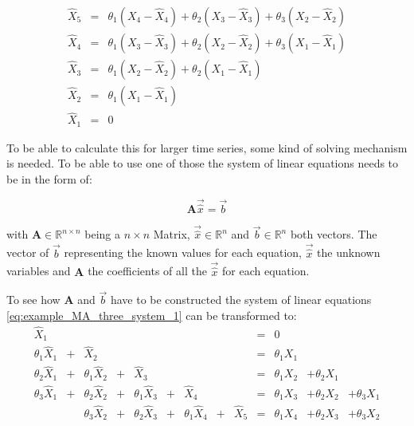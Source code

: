 \begin{equation}\label{eq:example_MA_three_system_1}
  \begin{array}{lcl}
    {\hat{X}}_{5} & = & \theta_1 (X_{4} - {\hat{X}}_{4}) + \theta_2 (X_{3} - {\hat{X}}_{3}) + \theta_3 (X_{2} - {\hat{X}}_{2}) \\
    {\hat{X}}_{4} & = & \theta_1 (X_{3} - {\hat{X}}_{3}) + \theta_2 (X_{2} - {\hat{X}}_{2}) + \theta_3 (X_{1} - {\hat{X}}_{1}) \\
  {\hat{X}}_{3} & = & \theta_1 (X_{2} - {\hat{X}}_{2}) + \theta_2 (X_{1} - {\hat{X}}_{1})\\
  {\hat{X}}_{2} & = & \theta_1 (X_{1} - {\hat{X}}_{1})\\
  {\hat{X}}_{1} & = & 0
  \end{array}
\end{equation}

To be able to calculate this for larger time series, some kind of solving mechanism is needed. To be able to use one of those the system of linear equations needs to be in the form of:

\begin{equation}\label{eq:syslinequation}
	 \mathbf{A}  \vec{\hat{x}} = \vec{b}
\end{equation}

with $\mathbf{A} \in \mathbb{R}^{n\times n}$ being a $n\times n$ Matrix,  $\vec{\hat{x}} \in \mathbb{R}^n$ and  $\vec{b}\in \mathbb{R}^n$ both vectors. The vector of $\vec{b}$ representing the known values for each equation, $\vec{\hat{x}}$ the unknown variables and $\mathbf{A}$ the coefficients of all the $\vec{\hat{x}}$ for each equation.

To see how $\mathbf{A}$ and  $\vec{b}$ have to be constructed the system of linear equations \eqref{eq:example_MA_three_system_1} can be transformed to:
\begin{equation}\label{eq:example_MA_three_system_2}
  \begin{array}{rcrcrcrcrclll}
  	{\hat{X}}_{1}&&&&&&&&& = &0&&\\
  	\theta_1 {\hat{X}}_{1} &+& {\hat{X}}_{2} & & & & & & &= &\theta_1 X_{1}&&\\
 	\theta_2 {\hat{X}}_{1}&+&\theta_1 {\hat{X}}_{2} &+& {\hat{X}}_{3}&  &  &&& = &\theta_1 X_{2} &+ \theta_2 X_{1}&\\
    \theta_3 {\hat{X}}_{1} &+& \theta_2 {\hat{X}}_{2} &+&  \theta_1 {\hat{X}}_{3}&+& {\hat{X}}_{4}& && = &\theta_1 X_{3} &+ \theta_2 X_{2} &+ \theta_3 X_{1}\\ 	
  &&\theta_3 {\hat{X}}_{2} &+& \theta_2 {\hat{X}}_{3}&+& \theta_1 {\hat{X}}_{4} &+&{\hat{X}}_{5}& = &  \theta_1 X_{4} &+\theta_2 X_{3} &+ \theta_3 X_{2}
  \end{array}
\end{equation}

